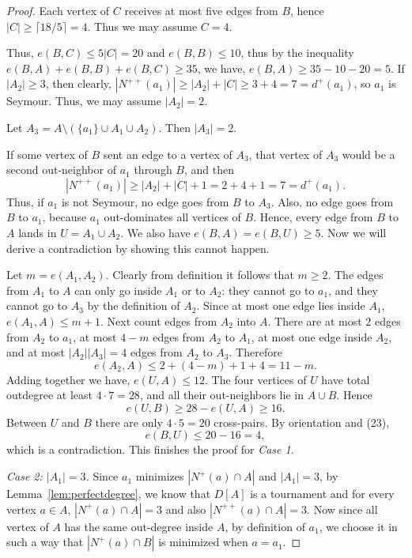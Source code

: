\documentclass[10pt,a4paper]{amsart}
\begin{document}
\begin{proof}
Each vertex of $C$ receives at most five edges from $B$, hence $|C|\ge \lceil 18/5\rceil=4$. Thus we may assume $C=4$.





Thus, $e(B,C)\le 5|C|=20$ and $e(B,B)\le 10$, thus by the inequality $e(B,A)+e(B,B)+e(B,C)\ge 35$, we have, $e(B,A)\ge 35-10-20=5.$
If $|A_2|\ge 3$, then clearly, $|N^{++}(a_1)|\ge |A_2|+|C|\ge 3+4=7=d^+(a_1)$,
so $a_1$ is Seymour. Thus, we may assume $|A_2|=2.$

Let $A_3=A\setminus (\{a_1\}\cup A_1\cup A_2).$ Then $|A_3|=2$. 

If some vertex of $B$ sent an edge to a vertex of $A_3$, that vertex of $A_3$ would be a second out-neighbor of $a_1$ through $B$, and then
\[
|N^{++}(a_1)|\ge |A_2|+|C|+1=2+4+1=7=d^+(a_1).
\]
Thus, if $a_1$ is not Seymour, no edge goes from $B$ to $A_3$. Also, no edge goes from $B$ to $a_1$, because $a_1$ out-dominates all vertices of $B$. Hence, every edge from $B$ to $A$ lands in $U=A_1\cup A_2.$ We also have $e(B,A)= e(B,U)\ge 5$. Now we will derive a contradiction by showing this cannot happen.


Let $m=e(A_1,A_2)$. Clearly from definition it follows that $m\geq 2$. The edges from $A_1$ to $A$ can only go inside $A_1$ or to $A_2$: they cannot go to $a_1$, and they cannot go to $A_3$ by the definition of $A_2$. Since at most one edge lies inside $A_1$, $e(A_1,A)\le m+1$.
Next count edges from $A_2$ into $A$. There are at most $2$ edges from $A_2$ to $a_1$, at most $4-m$ edges from $A_2$ to $A_1$, at most one edge inside $A_2$, and at most $|A_2||A_3|=4$ edges from $A_2$ to $A_3$. Therefore
\[
 e(A_2,A)\le 2+(4-m)+1+4=11-m.
\]
Adding together we have, $e(U,A)\le 12$.
The four vertices of $U$ have total outdegree at least $4\cdot 7=28$, and all their out-neighbors lie in $A\cup B$. Hence
\[
 e(U,B)\ge 28-e(U,A)\ge 16.
\]
Between $U$ and $B$ there are only $4\cdot 5=20$ cross-pairs. By orientation and (23),
\[
 e(B,U)\le 20-16=4,
\]
which is a contradiction. This finishes the proof for \emph{Case 1}.

\medskip
\noindent\emph{Case 2: $|A_1|=3$.}
Since $a_1$ minimizes $|N^+(a)\cap A|$ and $|A_1|=3$, by Lemma~\ref{lem:perfectdegree}, we know that $D[A]$ is a tournament and for every vertex $a\in A$, $|N^+(a) \cap A|=3$ and also $|N^{++}(a)\cap A|=3$. Now since all vertex of $A$ has the same out-degree inside $A$, by definition of $a_1$, we choose it in such a way that $|N^+(a)\cap B|$ is minimized when $a=a_1$.


\end{proof}
\end{document}
